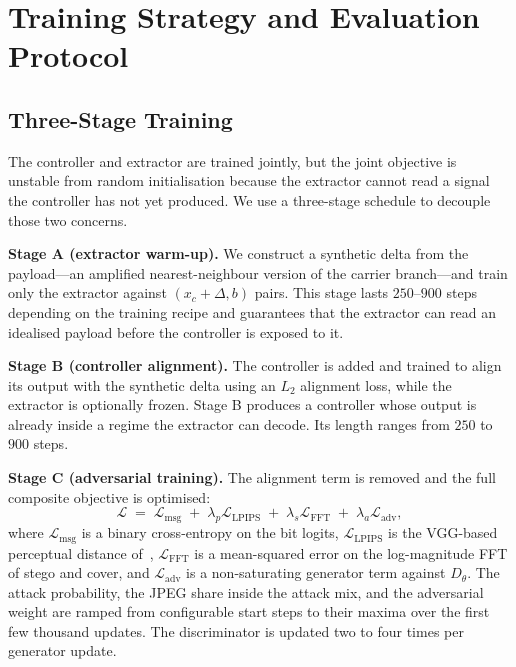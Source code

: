 \documentclass[journal]{IEEEtran}
\begin{document}
\section{Training Strategy and Evaluation Protocol}
\label{sec:training}

\subsection{Three-Stage Training}
The controller and extractor are trained jointly, but the joint
objective is unstable from random initialisation because the
extractor cannot read a signal the controller has not yet produced.
We use a three-stage schedule to decouple those two concerns.

\textbf{Stage A (extractor warm-up).}
We construct a synthetic delta from the payload---an amplified
nearest-neighbour version of the carrier branch---and train only the
extractor against $(x_c+\Delta, b)$ pairs. This stage lasts
$250\text{--}900$ steps depending on the training recipe and
guarantees that the extractor can read an idealised payload before
the controller is exposed to it.

\textbf{Stage B (controller alignment).}
The controller is added and trained to align its output with the
synthetic delta using an $L_2$ alignment loss, while the extractor
is optionally frozen. Stage B produces a controller whose output is
already inside a regime the extractor can decode. Its length ranges
from $250$ to $900$ steps.

\textbf{Stage C (adversarial training).}
The alignment term is removed and the full composite objective is
optimised:
\begin{equation}
\mathcal{L} \;=\;
\mathcal{L}_{\mathrm{msg}}
\;+\;\lambda_p\mathcal{L}_{\mathrm{LPIPS}}
\;+\;\lambda_s\mathcal{L}_{\mathrm{FFT}}
\;+\;\lambda_a\mathcal{L}_{\mathrm{adv}},
\end{equation}
where $\mathcal{L}_{\mathrm{msg}}$ is a binary cross-entropy on the
bit logits, $\mathcal{L}_{\mathrm{LPIPS}}$ is the VGG-based
perceptual distance of~\cite{zhang2018unreasonable},
$\mathcal{L}_{\mathrm{FFT}}$ is a mean-squared error on the
log-magnitude FFT of stego and cover, and $\mathcal{L}_{\mathrm{adv}}$
is a non-saturating generator term against $D_\theta$. The attack
probability, the JPEG share inside the attack mix, and the
adversarial weight are ramped from configurable start steps to
their maxima over the first few thousand updates. The discriminator
is updated two to four times per generator update.
\end{document}
